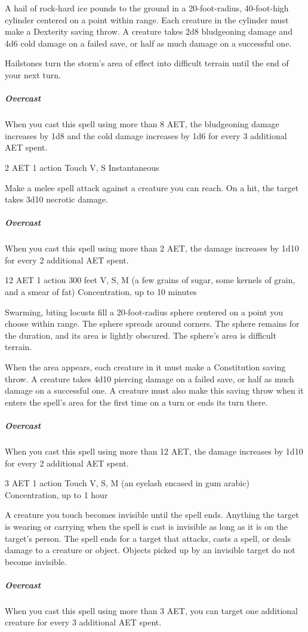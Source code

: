 A hail of rock-hard ice pounds to the ground in a 20-foot-radius, 40-foot-high cylinder centered on a point within range. Each creature in the cylinder must make a Dexterity saving throw. A creature takes 2d8 bludgeoning damage and 4d6 cold damage on a failed save, or half as much damage on a successful one.

Hailstones turn the storm's area of effect into difficult terrain until the end of your next turn.
\subparagraph*{Overcast} When you cast this spell using more than 8 AET, the bludgeoning damage increases by 1d8 and the cold damage increases by 1d6 for every 3 additional AET spent.

\label{spell:inflict-wounds}
{2 AET}
{1 action}
{Touch}
{V, S}
{Instantaneous}

Make a melee spell attack against a creature you can reach. On a hit, the target takes 3d10 necrotic damage.
\subparagraph*{Overcast} When you cast this spell using more than 2 AET, the damage increases by 1d10 for every 2 additional AET spent.

\label{spell:insect-plague}
{12 AET}
{1 action}
{300 feet}
{V, S, M (a few grains of sugar, some kernels of grain, and a smear of fat)}
{Concentration, up to 10 minutes}

Swarming, biting locusts fill a 20-foot-radius sphere centered on a point you choose within range. The sphere spreads around corners. The sphere remains for the duration, and its area is lightly obscured. The sphere's area is difficult terrain.

When the area appears, each creature in it must make a Constitution saving throw. A creature takes 4d10 piercing damage on a failed save, or half as much damage on a successful one. A creature must also make this saving throw when it enters the spell's area for the first time on a turn or ends its turn there.
\subparagraph*{Overcast} When you cast this spell using more than 12 AET, the damage increases by 1d10 for every 2 additional AET spent.

\label{spell:invisibility}
{3 AET}
{1 action}
{Touch}
{V, S, M (an eyelash encased in gum arabic)}
{Concentration, up to 1 hour}

A creature you touch becomes invisible until the spell ends. Anything the target is wearing or carrying when the spell is cast is invisible as long as it is on the target's person. The spell ends for a target that attacks, casts a spell, or deals damage to a creature or object. Objects picked up by an invisible target do not become invisible.
\subparagraph*{Overcast} When you cast this spell using more than 3 AET, you can target one additional creature for every 3 additional AET spent.

